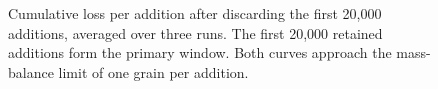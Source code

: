 \begin{figure}[htbp]
\caption{Cumulative loss per addition after discarding the first 20,000 additions, averaged over three runs. The first 20,000 retained additions form the primary window. Both curves approach the mass-balance limit of one grain per addition.}
\label{fig:loss}
\end{figure}
